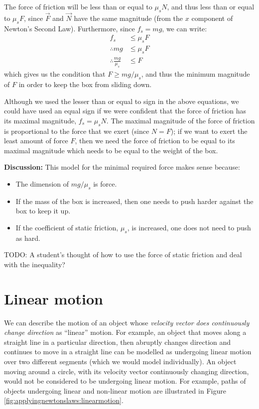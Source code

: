 \begin{example}
The force of friction will be less than or equal to $\mu_sN$, and thus less than or equal to $\mu_s F$, since $\vec F$ and $\vec N$ have the same magnitude (from the $x$ component of Newton's Second Law). Furthermore, since $f_s=mg$, we can write:
\begin{align*}
f_s &\leq \mu_s F\\
\therefore mg &\leq \mu_s F\\
\therefore \frac{mg}{\mu_s} &\leq F
\end{align*}
which gives us the condition that $F\geq mg/\mu_s$, and thus the minimum magnitude of $F$ in order to keep the box from sliding down.

Although we used the lesser than or equal to sign in the above equations, we could have used an equal sign if we were confident that the force of friction has its maximal magnitude, $f_s=\mu_sN$. The maximal magnitude of the force of friction is proportional to the force that we exert (since $N=F$); if we want to exert the least amount of force $F$, then we need the force of friction to be equal to its maximal magnitude which needs to be equal to the weight of the box. 

\textbf{Discussion:} This model for the minimal required force makes sense because:
\begin{itemize}
\item The dimension of $mg/\mu_s$ is force.
\item If the mass of the box is increased, then one needs to push harder against the box to keep it up.
\item If the coefficient of static friction, $\mu_s$, is increased, one does not need to push as hard. 
\end{itemize}
\end{example}

TODO: A student's thought of how to use the force of static friction and deal with the inequality?



\section{Linear motion}
We can describe the motion of an object whose \textit{velocity vector does continuously change direction} as ``linear'' motion. For example, an object that moves along a straight line in a particular direction, then abruptly changes direction and continues to move in a straight line can be modelled as undergoing linear motion over two different segments (which we would model individually). An object moving around a circle, with its velocity vector continuously changing direction, would not be considered to be undergoing linear motion. For example, paths of objects undergoing linear and non-linear motion are illustrated in Figure \ref{fig:applyingnewtonslaws:linearmotion}.

